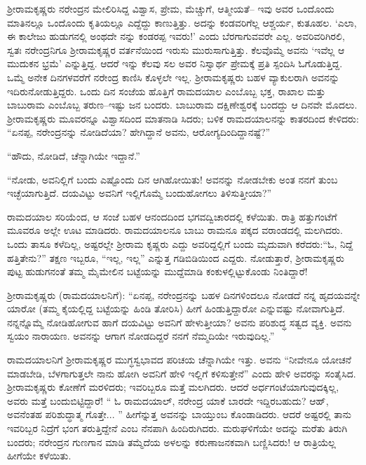 ಶ್ರೀರಾಮಕೃಷ್ಣರು ನರೇಂದ್ರನ ಮೇಲಿರಿಸಿದ್ದ ವಿಶ್ವಾಸ, ಪ್ರೇಮ, ಮೆಚ್ಚುಗೆ, ಆತ್ಮೀಯತೆ– ಇವು ಅವರ ಒಂದೊಂದು ಮಾತಿನಲ್ಲೂ ಒಂದೊಂದು ಕೃತಿಯಲ್ಲೂ ಎದ್ದೆದ್ದು ಕಾಣುತ್ತಿತ್ತು. ಅದನ್ನು ಕಂಡವರಿಗೆಲ್ಲ ಆಶ್ಚರ್ಯ, ಕುತೂಹಲ. ‘ಎಲಾ, ಈ ಕಾಲೇಜು ಹುಡುಗನಲ್ಲಿ ಅಂಥದೇ ನನ್ನು ಕಂಡರಪ್ಪ ಇವರು!’ ಎಂದು ಬೆರಗಾಗುವವರೇ ಎಲ್ಲ. ಅವರಿವರಿಗಿರಲಿ, ಸ್ವತಃ ನರೇಂದ್ರನಿಗೂ ಶ್ರೀರಾಮಕೃಷ್ಣರ ವರ್ತನೆಯಿಂದ ಇರುಸು ಮುರುಸಾಗುತ್ತಿತ್ತು. ಕೆಲವೊಮ್ಮೆ ಅವನು ‘ಇವೆಲ್ಲ ಆ ಮುದುಕನ ಭ್ರಮೆ’ ಎನ್ನುತ್ತಿದ್ದ. ಆದರೆ ಇನ್ನು ಕೆಲವು ಸಲ ಅವರ ನಿಸ್ವಾರ್ಥ ಪ್ರೇಮಕ್ಕೆ ಪ್ರತಿ ಸ್ಪಂದಿಸಿ ಓಗೊಡುತ್ತಿದ್ದ. ಒಮ್ಮೆ ಅನೇಕ ದಿನಗಳವರೆಗೆ ನರೇಂದ್ರ ಕಾಣಿಸಿ ಕೊಳ್ಳಲೇ ಇಲ್ಲ. ಶ್ರೀರಾಮಕೃಷ್ಣರು ಬಹಳ ವ್ಯಾಕುಲರಾಗಿ ಅವನನ್ನು ಇದಿರುನೋಡುತ್ತಿದ್ದರು. ಒಂದು ದಿನ ಸಂಜೆಯ ಹೊತ್ತಿಗೆ ರಾಮದಯಾಲ ಎಂಬೊಬ್ಬ ಭಕ್ತ, ರಾಖಾಲ ಮತ್ತು ಬಾಬುರಾಮ ಎಂಬೊಬ್ಬ ತರುಣ–ಇಷ್ಟು ಜನ ಬಂದರು. ಬಾಬುರಾಮ ದಕ್ಷಿಣೇಶ್ವರಕ್ಕೆ ಬಂದದ್ದು ಆ ದಿನವೇ ಮೊದಲು. ಶ್ರೀರಾಮಕೃಷ್ಣರು ಮೂವರನ್ನೂ ವಿಶ್ವಾಸದಿಂದ ಮಾತನಾಡಿ ಸಿದರು; ಬಳಿಕ ರಾಮದಯಾಲನನ್ನು ಕಾತರದಿಂದ ಕೇಳಿದರು: “ಏನಪ್ಪ, ನರೇಂದ್ರನನ್ನು ನೋಡಿದೆಯಾ? ಹೇಗಿದ್ದಾನೆ ಅವನು, ಆರೋಗ್ಯದಿಂದಿದ್ದಾನಷ್ಟೆ?”

“ಹೌದು, ನೋಡಿದೆ, ಚೆನ್ನಾಗಿಯೇ ಇದ್ದಾನೆ.”

“ನೋಡು, ಅವನಿಲ್ಲಿಗೆ ಬಂದು ಎಷ್ಟೊಂದು ದಿನ ಆಗಿಹೋಯಿತು! ಅವನನ್ನು ನೋಡಬೇಕು ಅಂತ ನನಗೆ ತುಂಬ ಇಚ್ಛೆಯಾಗುತ್ತಿದೆ. ದಯವಿಟ್ಟು ಅವನಿಗೆ ಇಲ್ಲಿಗೊಮ್ಮೆ ಬಂದುಹೋಗಲು ತಿಳಿಸುತ್ತೀಯಾ?”

ರಾಮದಯಾಲ ಸರಿಯೆಂದ, ಆ ಸಂಜೆ ಬಹಳ ಆನಂದದಿಂದ ಭಗವದ್ವಿಚಾರದಲ್ಲಿ ಕಳೆಯಿತು. ರಾತ್ರಿ ಹತ್ತುಗಂಟೆಗೆ ಮೂವರೂ ಅಲ್ಲೇ ಊಟ ಮಾಡಿದರು. ರಾಮದಯಾಲನೂ ಬಾಬು ರಾಮನೂ ಪಕ್ಕದ ವರಾಂಡದಲ್ಲಿ ಮಲಗಿದರು. ಒಂದು ತಾಸೂ ಕಳೆದಿಲ್ಲ, ಅಷ್ಟರಲ್ಲೇ ಶ್ರೀರಾಮ ಕೃಷ್ಣರು ಎದ್ದು ಅವರಿದ್ದಲ್ಲಿಗೆ ಬಂದು ಮೃದುವಾಗಿ ಕರೆದರು:“ಓ, ನಿದ್ದೆ ಹತ್ತಿತೇನು?” ತಕ್ಷಣ ಇಬ್ಬರೂ, “ಇಲ್ಲ, ಇಲ್ಲ” ಎನ್ನುತ್ತ ಗಡಿಬಿಡಿಯಿಂದ ಎದ್ದರು. ನೋಡುತ್ತಾರೆ, ಶ್ರೀರಾಮಕೃಷ್ಣರು ಪುಟ್ಟ ಹುಡುಗನಂತೆ ತಮ್ಮ ಮೈಮೇಲಿನ ಬಟ್ಟೆಯನ್ನು ಮುದ್ದೆಮಾಡಿ ಕಂಕುಳಲ್ಲಿಟ್ಟುಕೊಂಡು ನಿಂತಿದ್ದಾರೆ!

ಶ್ರೀರಾಮಕೃಷ್ಣರು (ರಾಮದಯಾಲನಿಗೆ): “ಏನಪ್ಪ, ನರೇಂದ್ರನನ್ನು ಬಹಳ ದಿನಗಳಿಂದಲೂ ನೋಡದೆ ನನ್ನ ಹೃದಯವನ್ನೇ ಯಾರೋ (ತಮ್ಮ ಕೈಯಲ್ಲಿದ್ದ ಬಟ್ಟೆಯನ್ನು ಹಿಂಡಿ ತೋರಿಸಿ) ಹೀಗೆ ಹಿಂಡುತ್ತಿದ್ದಾರೋ ಎನ್ನುವಷ್ಟು ನೋವಾಗುತ್ತಿದೆ. ನನ್ನನ್ನೊಮ್ಮೆ ನೋಡಿಹೋಗುವ ಹಾಗೆ ದಯವಿಟ್ಟು ಅವನಿಗೆ ಹೇಳುತ್ತೀಯಾ? ಅವನು ಪರಿಶುದ್ಧ ಸತ್ವದ ವ್ಯಕ್ತಿ. ಅವನು ಸ್ವಯಂ ನಾರಾಯಣ. ಅವನನ್ನು ಆಗಾಗ ನೋಡದಿದ್ದರೆ ನನಗೆ ನೆಮ್ಮದಿಯೇ ಇರುವುದಿಲ್ಲ.”

ರಾಮದಯಾಲನಿಗೆ ಶ್ರೀರಾಮಕೃಷ್ಣರ ಮುಗ್ಧಸ್ವಭಾವದ ಪರಿಚಯ ಚೆನ್ನಾಗಿಯೇ ಇತ್ತು. ಅವನು “ನೀವೇನೂ ಯೋಚನೆ ಮಾಡಬೇಡಿ, ಬೆಳಗಾಗುತ್ತಲೇ ನಾನು ಹೋಗಿ ಅವನಿಗೆ ಹೇಳಿ ಇಲ್ಲಿಗೆ ಕಳಿಸುತ್ತೇನೆ” ಎಂದು ಹೇಳಿ ಅವರನ್ನು ಸಂತೈಸಿದ. ಶ್ರೀರಾಮಕೃಷ್ಣರು ಕೋಣೆಗೆ ಮರಳಿದರು; ಇವರಿಬ್ಬರೂ ಮತ್ತೆ ಮಲಗಿದರು. ಆದರೆ ಅರ್ಧಗಂಟೆಯಾಗುವುದಕ್ಕಿಲ್ಲ, ಅವರು ಮತ್ತೆ ಬಂದುಬಿಟ್ಟಿದ್ದಾರೆ! “ ಓ ರಾಮದಯಾಲ್, ನರೇಂದ್ರ ಯಾಕೆ ಬಾರದೇ ಇದ್ದಿರಬಹುದು? ಆಹ್, ಅವನೆಂತಹ ಪರಿಶುದ್ಧಾತ್ಮ ಗೊತ್ತೇ... ” ಹೀಗೆನ್ನುತ್ತ ಅವನನ್ನು ಬಾಯ್ತುಂಬ ಕೊಂಡಾಡಿದರು. ಆದರೆ ಅಷ್ಟರಲ್ಲಿ ತಾನು ಇವರಿಬ್ಬರ ನಿದ್ರೆಗೆ ಭಂಗ ತರುತ್ತಿದ್ದೇನೆ ಎಂಬ ನೆನಪಾಗಿ ಹಿಂದಿರುಗಿದರು. ಮರುಘಳಿಗೆಯೇ ಅದನ್ನು ಮರೆತು ತಿರುಗಿ ಬಂದರು; ನರೇಂದ್ರನ ಗುಣಗಾನ ಮಾಡಿ ತಮ್ಮೆದೆಯ ಅಳಲನ್ನು ಕರುಣಾಜನಕವಾಗಿ ಬಣ್ಣಿಸಿದರು! ಆ ರಾತ್ರಿಯೆಲ್ಲ ಹೀಗೆಯೇ ಕಳೆಯಿತು.

